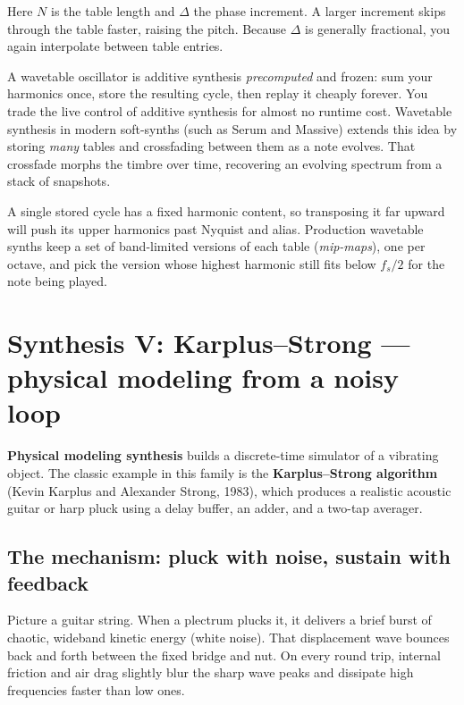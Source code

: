Here $N$ is the table length and $\Delta$ the phase increment. A larger increment
skips through the table faster, raising the pitch. Because $\Delta$ is generally
fractional, you again interpolate between table entries.

\begin{intuitionbox}
A wavetable oscillator is additive synthesis \emph{precomputed} and frozen:
sum your harmonics once, store the resulting cycle, then replay it cheaply
forever. You trade the live control of additive synthesis for almost no runtime
cost. Wavetable synthesis in modern soft-synths (such as Serum and Massive) extends this idea
by storing \emph{many} tables and crossfading between them as a note
evolves. That crossfade morphs the timbre over time, recovering an evolving spectrum
from a stack of snapshots.
\end{intuitionbox}

\begin{trapbox}
A single stored cycle has a fixed harmonic content, so transposing it far upward
will push its upper harmonics past Nyquist and alias. Production wavetable
synths keep a set of band-limited versions of each table (\emph{mip-maps}), one
per octave, and pick the version whose highest harmonic still fits below $f_s/2$
for the note being played.
\end{trapbox}

\section{Synthesis V: Karplus--Strong --- physical modeling from a noisy loop}
\label{ch28:karplus-strong}

\textbf{Physical modeling synthesis} builds a discrete-time simulator of a vibrating object. The classic example in this family is the \textbf{Karplus--Strong algorithm}
(Kevin Karplus and Alexander Strong, 1983), which produces a realistic acoustic guitar
or harp pluck using a delay buffer, an adder, and a two-tap averager.

\subsection{The mechanism: pluck with noise, sustain with feedback}

Picture a guitar string. When a plectrum plucks it, it delivers a brief burst of chaotic,
wideband kinetic energy (white noise). That displacement wave bounces back and forth between
the fixed bridge and nut. On every round trip, internal friction and air drag slightly blur
the sharp wave peaks and dissipate high frequencies faster than low ones.

